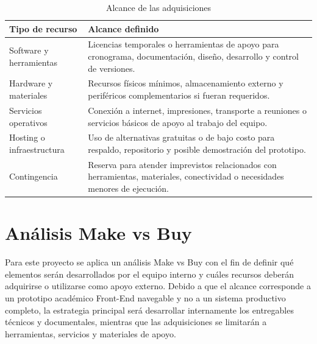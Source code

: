 \documentclass[11pt,spanish]{article}
\begin{document}
\begin{table}[H]
\centering
\caption{Alcance de las adquisiciones}
\label{tab:alcance-adquisiciones}
{\small
\begin{tabularx}{\textwidth}{p{4cm} Y}
\toprule
\textbf{Tipo de recurso} & \textbf{Alcance definido} \\
\midrule
Software y herramientas & Licencias temporales o herramientas de apoyo para cronograma, documentación, diseño, desarrollo y control de versiones. \\
Hardware y materiales & Recursos físicos mínimos, almacenamiento externo y periféricos complementarios si fueran requeridos. \\
Servicios operativos & Conexión a internet, impresiones, transporte a reuniones o servicios básicos de apoyo al trabajo del equipo. \\
Hosting o infraestructura & Uso de alternativas gratuitas o de bajo costo para respaldo, repositorio y posible demostración del prototipo. \\
Contingencia & Reserva para atender imprevistos relacionados con herramientas, materiales, conectividad o necesidades menores de ejecución. \\
\bottomrule
\end{tabularx}
}
\end{table}


\section{Análisis Make vs Buy}

Para este proyecto se aplica un análisis Make vs Buy con el fin de definir qué elementos serán desarrollados por el equipo interno y cuáles recursos deberán adquirirse o utilizarse como apoyo externo. Debido a que el alcance corresponde a un prototipo académico Front-End navegable y no a un sistema productivo completo, la estrategia principal será desarrollar internamente los entregables técnicos y documentales, mientras que las adquisiciones se limitarán a herramientas, servicios y materiales de apoyo.
\end{document}
